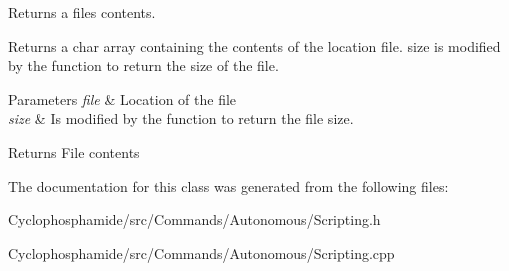 Returns a file\textquotesingle{}s contents. 

Returns a char array containing the contents of the location file. size is modified by the function to return the size of the file. 
\begin{DoxyParams}{Parameters}
{\em file} & Location of the file \\
\hline
{\em size} & Is modified by the function to return the file size. \\
\hline
\end{DoxyParams}
\begin{DoxyReturn}{Returns}
File contents 
\end{DoxyReturn}


The documentation for this class was generated from the following files\+:\begin{DoxyCompactItemize}
\item 
Cyclophosphamide/src/\+Commands/\+Autonomous/Scripting.\+h\item 
Cyclophosphamide/src/\+Commands/\+Autonomous/Scripting.\+cpp\end{DoxyCompactItemize}
